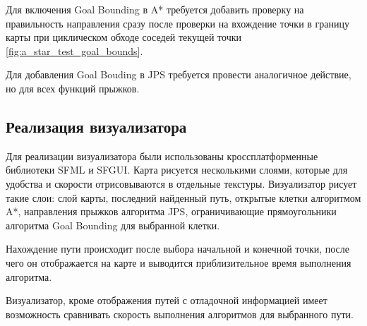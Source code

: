 Для включения Goal Bounding в A* требуется добавить проверку на правильность направления сразу после проверки на вхождение точки в границу карты при циклическом обходе соседей текущей точки \cref{fig:a_star_test_goal_bounds}. 

Для добавления Goal Bouding в JPS требуется провести аналогичное действие, но для всех функций прыжков.


\subsection{Реализация визуализатора}

Для реализации визуализатора были использованы кроссплатформенные библиотеки SFML и SFGUI. Карта рисуется несколькими слоями, которые для удобства и скорости отрисовываются в отдельные текстуры. Визуализатор рисует такие слои: слой карты, последний найденный путь, открытые клетки алгоритмом A*, направления прыжков алгоритма JPS, ограничивающие прямоугольники алгоритма Goal Bounding для выбранной клетки.

Нахождение пути происходит после выбора начальной и конечной точки, после чего он отображается на карте и выводится приблизительное время выполнения алгоритма. 

Визуализатор, кроме отображения путей с отладочной информацией имеет возможность сравнивать скорость выполнения алгоритмов для выбранного пути.